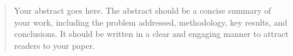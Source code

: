 \begin{abstract}
Your abstract goes here.
The abstract should be a concise summary of your work, including the problem addressed, methodology, key results, and conclusions.
It should be written in a clear and engaging manner to attract readers to your paper.
\end{abstract}
